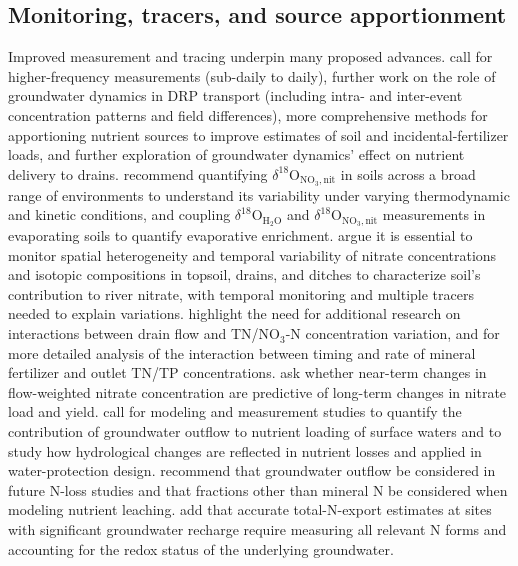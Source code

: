 \subsection{Monitoring, tracers, and source apportionment}
Improved measurement and tracing underpin many proposed advances. \textcite{Williams2022} call for higher-frequency measurements (sub-daily to daily), further work on the role of groundwater dynamics in DRP transport (including intra- and inter-event concentration patterns and field differences), more comprehensive methods for apportioning nutrient sources to improve estimates of soil and incidental-fertilizer loads, and further exploration of groundwater dynamics' effect on nutrient delivery to drains. \textcite{Hu2024} recommend quantifying $\delta^{18}$O$_{\mathrm{NO_3,nit}}$ in soils across a broad range of environments to understand its variability under varying thermodynamic and kinetic conditions, and coupling $\delta^{18}$O$_{\mathrm{H_2O}}$ and $\delta^{18}$O$_{\mathrm{NO_3,nit}}$ measurements in evaporating soils to quantify evaporative enrichment. \textcite{Briand2017} argue it is essential to monitor spatial heterogeneity and temporal variability of nitrate concentrations and isotopic compositions in topsoil, drains, and ditches to characterize soil's contribution to river nitrate, with temporal monitoring and multiple tracers needed to explain variations. \textcite{Lagzdins2015} highlight the need for additional research on interactions between drain flow and TN/NO$_3$-N concentration variation, and for more detailed analysis of the interaction between timing and rate of mineral fertilizer and outlet TN/TP concentrations. \textcite{Danalatos2022} ask whether near-term changes in flow-weighted nitrate concentration are predictive of long-term changes in nitrate load and yield. \textcite{Turunen2013} call for modeling and measurement studies to quantify the contribution of groundwater outflow to nutrient loading of surface waters and to study how hydrological changes are reflected in nutrient losses and applied in water-protection design. \textcite{Jokinen2024} recommend that groundwater outflow be considered in future N-loss studies and that fractions other than mineral N be considered when modeling nutrient leaching. \textcite{Barkle2021} add that accurate total-N-export estimates at sites with significant groundwater recharge require measuring all relevant N forms and accounting for the redox status of the underlying groundwater.

